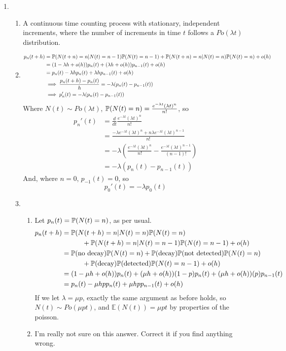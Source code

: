 \documentclass{article}
\begin{document}
\begin{enumerate}
\begin{enumerate}
\end{enumerate}
\clearpage
\item
\begin{enumerate}
\item
A continuous time counting process with stationary, independent increments,
where the number of increments in time $t$ follows a $Po(\lambda t)$
distribution.
\item
\begin{align*}
p_n(t+h) &= \mathbb{P}(N(t+n)=n | N(t) = n-1)\mathbb{P}(N(t)=n-1) + \mathbb{P}(N(t+n)=n | N(t) =
n)\mathbb{P}(N(t)=n) + o(h) \\
&= (1-\lambda h +o(h))p_n(t) + (\lambda h + o(h))p_{n-1}(t) + o(h)\\
&= p_n(t) -\lambda h p_n(t) + \lambda h p_{n-1}(t) + o(h)\\
&\implies \frac{p_n(t+h)-p_n(t)}{h} = -\lambda(p_n(t)-p_{n-1}(t))\\
&\implies p_n'(t) = -\lambda(p_n(t)-p_{n-1}(t))
\end{align*}
Where $N(t) \sim Po(\lambda t)$, $\mathbb{P}(N(t)=n) = \frac{e^{-\lambda t}(\lambda 
t)^n}{n!}$, so
\begin{align*}
p_n'(t) &= \frac{d}{dt} \frac{e^{-\lambda t}(\lambda t)^n}{n!}\\
&= \frac{-\lambda e^{-\lambda t}(\lambda t)^n + n \lambda e^{-\lambda t}(\lambda t)^{n-1}}{n!}\\
&= -\lambda \left( \frac{e^{-\lambda t}(\lambda t)^n}{n!} - \frac{e^{-\lambda 
t}(\lambda t)^{n-1}}{(n-1)!}\right)\\
&= -\lambda(p_n(t) - p_{n-1}(t))
\end{align*}
And, where $n=0$, $p_{-1}(t) = 0$, so 
$$
p_0'(t) = -\lambda p_0(t)
$$
\item
\begin{enumerate}
\item
Let $p_n(t) = \mathbb{P}(N(t) = n)$, as per usual.
\begin{align*}
p_n(t+h) &= \mathbb{P}(N(t+h) = n | N(t) = n)\mathbb{P}(N(t)=n) \\
&\quad \quad \quad + \mathbb{P}(N(t+h)=n|N(t)=n-1)\mathbb{P}(N(t)=n-1)+o(h)\\
&=\mathbb{P}(\mbox{no decay})\mathbb{P}(N(t)=n) + \mathbb{P}(\mbox{decay})\mathbb{P}(\mbox{not
detected})\mathbb{P}(N(t)=n)
\\ & \quad \quad \quad +
\mathbb{P}(\mbox{decay})\mathbb{P}(\mbox{detected})\mathbb{P}(N(t)=n-1)+o(h)\\
&= (1-\mu h + o(h))p_n(t) + (\mu h + o(h))(1-p)p_n(t) + (\mu
h+o(h))(p)p_{n-1}(t)\\
&= p_n(t)-\mu h p p_n(t) + \mu h p p_{n-1}(t) +o(h)
\end{align*}
If we let $\lambda = \mu p$, exactly the same argument as before holds, so 
$N(t)\sim Po(\mu p t)$, and $\mathbb{E}(N(t)) = \mu p t$ by properties of the
poisson.
\item
I'm really not sure on this answer. Correct it if you find anything wrong.


\end{enumerate}
\end{enumerate}
\end{enumerate}
\end{document}
